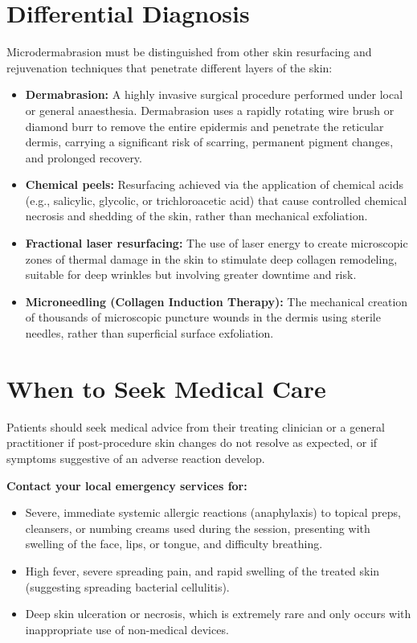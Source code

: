 \section*{Differential Diagnosis}
Microdermabrasion must be distinguished from other skin resurfacing and rejuvenation techniques that penetrate different layers of the skin:
\begin{itemize}
    \item \textbf{Dermabrasion:} A highly invasive surgical procedure performed under local or general anaesthesia. Dermabrasion uses a rapidly rotating wire brush or diamond burr to remove the entire epidermis and penetrate the reticular dermis, carrying a significant risk of scarring, permanent pigment changes, and prolonged recovery.
    \item \textbf{Chemical peels:} Resurfacing achieved via the application of chemical acids (e.g., salicylic, glycolic, or trichloroacetic acid) that cause controlled chemical necrosis and shedding of the skin, rather than mechanical exfoliation.
    \item \textbf{Fractional laser resurfacing:} The use of laser energy to create microscopic zones of thermal damage in the skin to stimulate deep collagen remodeling, suitable for deep wrinkles but involving greater downtime and risk.
    \item \textbf{Microneedling (Collagen Induction Therapy):} The mechanical creation of thousands of microscopic puncture wounds in the dermis using sterile needles, rather than superficial surface exfoliation.
\end{itemize}

\section*{When to Seek Medical Care}
Patients should seek medical advice from their treating clinician or a general practitioner if post-procedure skin changes do not resolve as expected, or if symptoms suggestive of an adverse reaction develop.

\textbf{Contact your local emergency services for:}
\begin{itemize}
    \item Severe, immediate systemic allergic reactions (anaphylaxis) to topical preps, cleansers, or numbing creams used during the session, presenting with swelling of the face, lips, or tongue, and difficulty breathing.
    \item High fever, severe spreading pain, and rapid swelling of the treated skin (suggesting spreading bacterial cellulitis).
    \item Deep skin ulceration or necrosis, which is extremely rare and only occurs with inappropriate use of non-medical devices.
\end{itemize}

